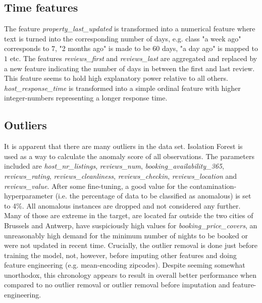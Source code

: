 \documentclass[11pt, oneside]{article}   	%
\begin{document}
\subsection{Time features}
The feature \textit{property\_last\_updated} is transformed into a numerical feature where text is turned into the corresponding number of days, e.g. class "a week ago" corresponds to $7$, "2 months ago" is made to be $60$ days, "a day ago" is mapped to $1$ etc.\newline
The features \textit{reviews\_first} and \textit{reviews\_last} are aggregated and replaced by a new feature indicating the number of days in between the first and last review. This feature seems to hold high explanatory power relative to all others.\newline
\textit{host\_response\_time} is transformed into a simple ordinal feature with higher integer-numbers representing a longer response time.

\subsection{Outliers}
It is apparent that there are many outliers in the data set. Isolation Forest is used as a way to calculate the anomaly score of all observations. The parameters included are \textit{host\_nr\_listings}, \textit{reviews\_num}, \textit{booking\_availability\_365}, \textit{reviews\_rating}, \textit{reviews\_cleanliness}, \textit{reviews\_checkin}, \textit{reviews\_location} and \textit{reviews\_value}.  After some fine-tuning, a good value for the contamination-hyperparameter (i.e. the percentage of data  to be classified as anomalous) is set to 4\%. All anomalous instances are dropped and not considered any further. Many of those are extreme in the target, are located far outside the two cities of Brussels and Antwerp, have suspiciously high values for \textit{booking\_price\_covers}, an unreasonably high demand for the minimum number of nights to be booked or were not updated in recent time.\newline
Crucially, the outlier removal is done just before training the model, not, however, before imputing other features and doing feature engineering (e.g. mean-encoding zipcodes). Despite seeming somewhat unorthodox, this chronology appears to result in overall better performance when compared to no outlier removal or outlier removal before imputation and feature-engineering.
\end{document}
